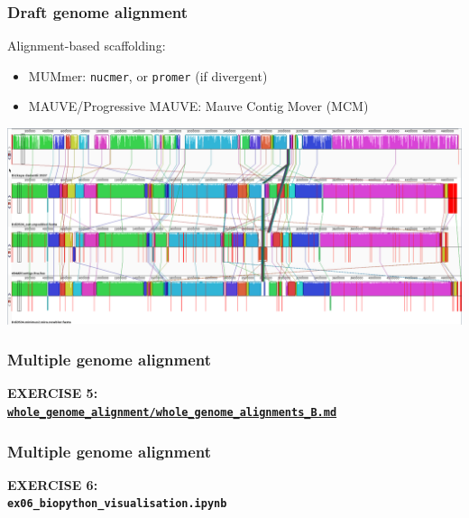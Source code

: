 %
\begin{frame}
  \frametitle{Draft genome alignment}
  Alignment-based scaffolding:
  \begin{itemize}
    \item \textcolor{hutton_blue}{MUMmer}: \texttt{nucmer}, or \texttt{promer} (if divergent)
    \item \textcolor{hutton_purple}{MAUVE/Progressive MAUVE}: Mauve Contig Mover (MCM)
  \end{itemize}
  \begin{center}
    \includegraphics[width=\textwidth]{images/mauve_scaffolding}
  \end{center}    
\end{frame}

%
\begin{frame}
  \frametitle{Multiple genome alignment}
  \Large{
    \textcolor{hutton_blue}{
      \textbf{
      EXERCISE 5: \\
      {\small \href{https://github.com/widdowquinn/Teaching-2015-03-17-UoD_compgenvis/blob/master/exercises/whole_genome_alignment/whole_genome_alignments_B.md}{\texttt{whole\_genome\_alignment/whole\_genome\_alignments\_B.md}}}
      }
    }
  }
\end{frame}

%
\begin{frame}
  \frametitle{Multiple genome alignment}
  \Large{
    \textcolor{hutton_blue}{
      \textbf{
      EXERCISE 6: \\
      \texttt{ex06\_biopython\_visualisation.ipynb}
      }
    }
  }
\end{frame}

